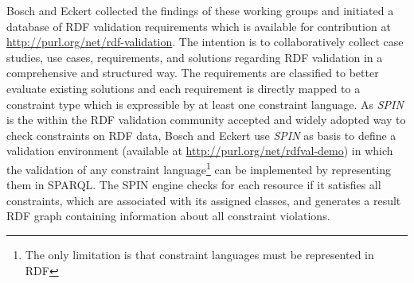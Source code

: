 \documentclass{llncs}
\begin{document}
Bosch and Eckert \cite{BoschEckert2014} collected the findings of these working groups and initiated a database of RDF validation requirements
which is available for contribution at \url{http://purl.org/net/rdf-validation}.
The intention is to collaboratively collect case studies, use cases, requirements, and solutions regarding RDF validation in a comprehensive and structured way. 
The requirements are classified to better evaluate existing solutions and each requirement is directly mapped to a constraint type which is expressible by at least one constraint language.
As \emph{SPIN} is the within the RDF validation community accepted and widely adopted way to check constraints on RDF data, Bosch and Eckert \cite{BoschEckert2014-2} use \emph{SPIN} as basis to define a
validation environment (available at \url{http://purl.org/net/rdfval-demo}) in which the validation of any constraint language\footnote{The only limitation is that constraint languages must be represented in RDF} can be implemented by representing them in SPARQL. 
The SPIN engine checks for each resource if it satisfies all constraints, which are associated with its assigned classes, and generates a result RDF graph containing information about all constraint violations.

\end{document}
